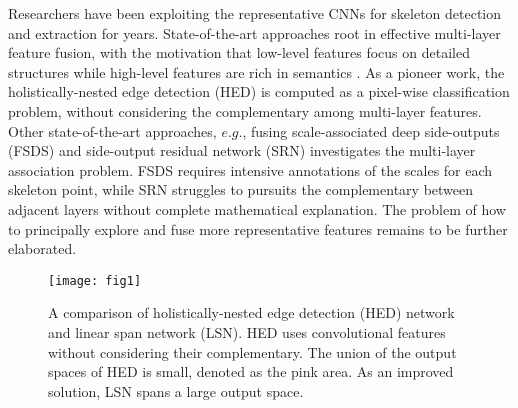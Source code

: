 \documentclass[runningheads]{llncs}
\begin{document}
Researchers have been exploiting the representative CNNs for skeleton detection and extraction \cite{ref1,ref6,ref7,ref33} for years. State-of-the-art approaches root in effective multi-layer feature fusion, with the motivation that low-level features focus on detailed structures while high-level features are rich in semantics \cite{ref1}. As a pioneer work, the holistically-nested edge detection (HED) \cite{ref6} is computed as a pixel-wise classification problem, without considering the complementary among multi-layer features. Other state-of-the-art approaches, $e.g.$, fusing scale-associated deep side-outputs (FSDS) \cite{ref7,ref33} and side-output residual network (SRN) \cite{ref1} investigates the multi-layer association problem. FSDS requires intensive annotations of the scales for each skeleton point, while SRN struggles to pursuits the complementary between adjacent layers without complete mathematical explanation. The problem of how to principally explore and fuse more representative features remains to be further elaborated.

\begin{figure}[t]
\centering
\texttt{[image: fig1]}
\caption{A comparison of holistically-nested edge detection (HED) network \cite{ref6} and linear span network (LSN). HED uses convolutional features without considering their complementary. The union of the output spaces of HED is small, denoted as the pink area. As an improved solution, LSN spans a large output space. }
\label{fig:shot}
\end{figure}
\end{document}
